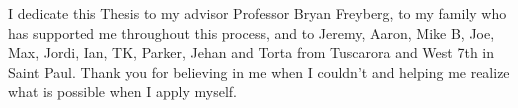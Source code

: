 I dedicate this Thesis to my advisor Professor Bryan Freyberg, to my family who has supported me throughout this process, and to Jeremy, Aaron, Mike B, Joe, Max, Jordi, Ian, TK, Parker, Jehan and Torta from Tuscarora and West 7th in Saint Paul. Thank you for believing in me when I couldn't and helping me realize what is possible when I apply myself.
